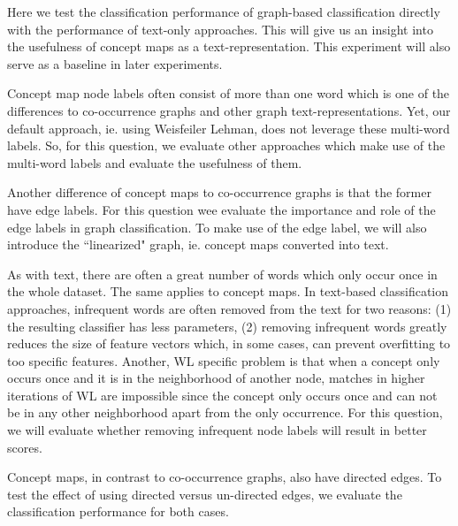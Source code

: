 Here we test the classification performance of graph-based classification directly with the performance of text-only approaches.
This will give us an insight into the usefulness of concept maps as a text-representation.
This experiment will also serve as a baseline in later experiments.

Concept map node labels often consist of more than one word which is one of the differences to co-occurrence graphs and other graph text-representations.
Yet, our default approach, ie. using Weisfeiler Lehman, does not leverage these multi-word labels.
So, for this question, we evaluate other approaches which make use of the multi-word labels and evaluate the usefulness of them.

Another difference of concept maps to co-occurrence graphs is that the former have edge labels.
For this question wee evaluate the importance and role of the edge labels in graph classification. To make use of the edge label, we will also introduce the ``linearized" graph, ie. concept maps converted into text.

As with text, there are often a great number of words which only occur once in the whole dataset. The same applies to concept maps.
In text-based classification approaches, infrequent words are often removed from the text for two reasons: (1) the resulting classifier has less parameters, (2) removing infrequent words greatly reduces the size of feature vectors which, in some cases, can prevent overfitting to too specific features.
Another, WL specific problem is that when a concept only occurs once and it is in the neighborhood of another node, matches in higher iterations of WL are impossible since the concept only occurs once and can not be in any other neighborhood apart from the only occurrence.
For this question, we will evaluate whether removing infrequent node labels will result in better scores.

Concept maps, in contrast to co-occurrence graphs, also have directed edges.
To test the effect of using directed versus un-directed edges, we evaluate the classification performance for both cases.

